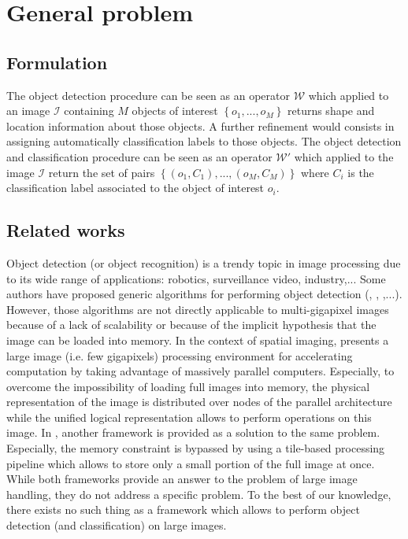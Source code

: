 \label{chap:context}
\section{General problem}
\subsection{Formulation}
The object detection procedure can be seen as an operator $\mathcal{W}$ which applied to an image $\mathcal{I}$ containing $M$ objects of interest $\left\{o_1,...,o_M\right\}$ returns shape and location information about those objects. A further refinement would consists in assigning automatically classification labels to those objects. The object detection and classification procedure can be seen as an operator $\mathcal{W}'$ which applied to the image $\mathcal{I}$ return the set of pairs $\left\{\left(o_1, C_1\right), ..., \left(o_M, C_M\right)\right\}$ where $C_i$ is the classification label associated to the object of interest $o_i$. 

\subsection{Related works}
Object detection (or object recognition) is a trendy topic in image processing due to its wide range of applications: robotics, surveillance video, industry,...  Some authors have proposed generic algorithms for performing object detection (\cite{lecun2004learning}, \cite{opelt2006generic}, \cite{wang2013regionlets},...). However, those algorithms are not directly applicable to multi-gigapixel images because of a lack of scalability or because of the implicit hypothesis that the image can be loaded into memory. In the context of spatial imaging, \cite{jones2003gigapixel} presents a large image (i.e. few gigapixels) processing environment for accelerating computation by taking advantage of massively parallel computers. Especially, to overcome the impossibility of loading full images into memory, the physical representation of the image is distributed over nodes of the parallel architecture while the unified logical representation allows to perform operations on this image. In \cite{powell2010scalable}, another framework is provided as a solution to the same problem. Especially, the memory constraint is bypassed by using a tile-based processing pipeline which allows to store only a small portion of the full image at once. While both frameworks provide an answer to the problem of large image handling, they do not address a specific problem. To the best of our knowledge, there exists no such thing as a framework which allows to perform object detection (and classification) on large images.


